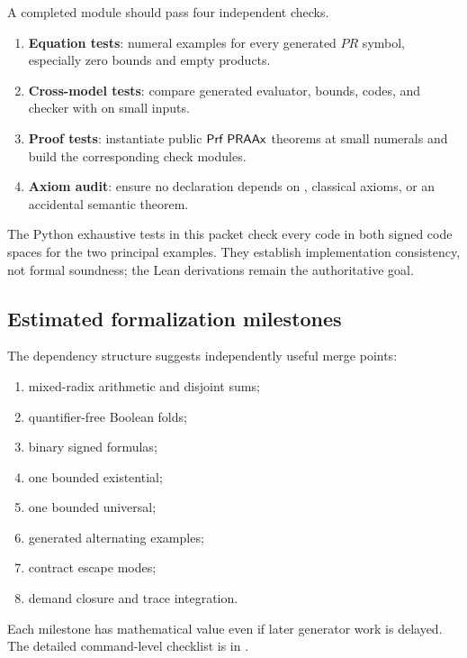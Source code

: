 A completed module should pass four independent checks.

\begin{enumerate}
\item \textbf{Equation tests}: numeral examples for every generated \(PR\)
symbol, especially zero bounds and empty products.
\item \textbf{Cross-model tests}: compare generated evaluator, bounds, codes,
and checker with  on small inputs.
\item \textbf{Proof tests}: instantiate public \(\mathsf{Prf}\;\mathsf{PRAAx}\) theorems at
small numerals and build the corresponding check modules.
\item \textbf{Axiom audit}: ensure no declaration depends on ,
classical axioms, or an accidental semantic theorem.
\end{enumerate}

The Python exhaustive tests in this packet check every code in both signed code
spaces for the two principal examples.  They establish implementation
consistency, not formal soundness; the Lean derivations remain the authoritative
goal.

\subsection{Estimated formalization milestones}

The dependency structure suggests independently useful merge points:

\begin{enumerate}
\item mixed-radix arithmetic and disjoint sums;
\item quantifier-free Boolean folds;
\item binary signed formulas;
\item one bounded existential;
\item one bounded universal;
\item generated alternating examples;
\item contract escape modes;
\item demand closure and trace integration.
\end{enumerate}

Each milestone has mathematical value even if later generator work is delayed.
The detailed command-level checklist is in .
